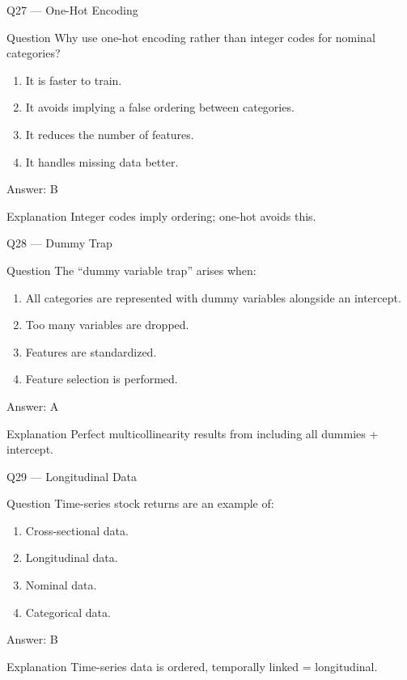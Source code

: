 \documentclass[aspectratio=169,8pt]{beamer}
\begin{document}
	\begin{frame}{Q27 --- One-Hot Encoding}
		\begin{block}{Question}
			Why use one-hot encoding rather than integer codes for nominal categories?
		\end{block}
		\begin{enumerate}
			\item It is faster to train.
			\item It avoids implying a false ordering between categories.
			\item It reduces the number of features.
			\item It handles missing data better.
		\end{enumerate}
		\begin{exampleblock}{Answer: B}\end{exampleblock}
		\begin{block}{Explanation}
			Integer codes imply ordering; one-hot avoids this.
		\end{block}
	\end{frame}
	
	\begin{frame}{Q28 --- Dummy Trap}
		\begin{block}{Question}
			The ``dummy variable trap'' arises when:
		\end{block}
		\begin{enumerate}
			\item All categories are represented with dummy variables alongside an intercept.
			\item Too many variables are dropped.
			\item Features are standardized.
			\item Feature selection is performed.
		\end{enumerate}
		\begin{exampleblock}{Answer: A}\end{exampleblock}
		\begin{block}{Explanation}
			Perfect multicollinearity results from including all dummies + intercept.
		\end{block}
	\end{frame}
	
	\begin{frame}{Q29 --- Longitudinal Data}
		\begin{block}{Question}
			Time-series stock returns are an example of:
		\end{block}
		\begin{enumerate}
			\item Cross-sectional data.
			\item Longitudinal data.
			\item Nominal data.
			\item Categorical data.
		\end{enumerate}
		\begin{exampleblock}{Answer: B}\end{exampleblock}
		\begin{block}{Explanation}
			Time-series data is ordered, temporally linked = longitudinal.
		\end{block}
	\end{frame}
	
\end{document}
